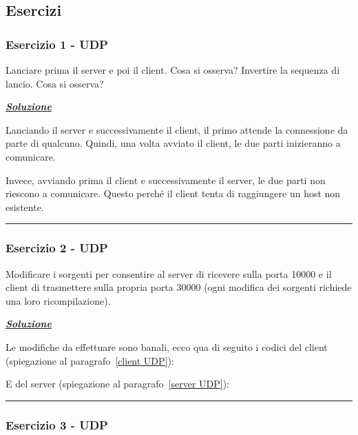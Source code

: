 \documentclass[a4paper]{article}
\newcommand{\longline}{\noindent\rule{\textwidth}{0.4pt}}
\begin{document}
	\subsection[\textcolor{Red3}{\textbf{Esercizi}}]{Esercizi}
	
	\subsubsection{Esercizio 1 - UDP}
	
	Lanciare prima il server e poi il client. Cosa si osserva? Invertire la sequenza di lancio. Cosa si osserva?\newline
	
	\noindent
	\textcolor{Green4}{\textbf{\emph{\underline{Soluzione}}}}\newline
	
	\noindent
	Lanciando il server e successivamente il client, il primo attende la connessione da parte di qualcuno. Quindi, una volta avviato il client, le due parti inizieranno a comunicare.
	
	Invece, avviando prima il client e successivamente il server, le due parti non riescono a comunicare. Questo perché il client tenta di raggiungere un host non esistente.
	
	\longline
	
	\subsubsection{Esercizio 2 - UDP}
	
	Modificare i sorgenti per consentire al server di ricevere sulla porta 10000 e il client di trasmettere sulla propria porta 30000 (ogni modifica dei sorgenti richiede una loro ricompilazione).\newline
	
	\noindent
	\textcolor{Green4}{\textbf{\emph{\underline{Soluzione}}}}\newline
	
	\noindent
	Le modifiche da effettuare sono banali, ecco qua di seguito i codici del client (spiegazione al paragrafo~\ref{client UDP}):
	\newpage
	
	\noindent
	E del server (spiegazione al paragrafo~\ref{server UDP}):
	
	
	\longline
	
	\subsubsection{Esercizio 3 - UDP}
	
\end{document}
